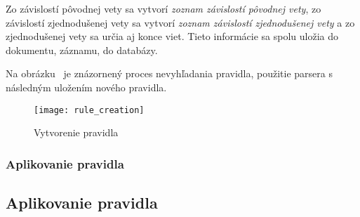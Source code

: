 Zo závislostí pôvodnej vety sa vytvorí \textit{zoznam závislostí pôvodnej vety}, zo závislostí zjednodušenej vety sa vytvorí \textit{zoznam závislostí zjednodušenej vety} a zo zjednodušenej vety sa určia aj konce viet. Tieto informácie sa spolu uložia do dokumentu, záznamu, do databázy.

Na obrázku~ je znázornený proces nevyhľadania pravidla, použitie parsera s následným uložením nového pravidla.

\begin{figure}[H]
	\begin{center}\texttt{[image: rule\_creation]}\end{center}
	\caption[Vytvorenie pravidla]{Vytvorenie pravidla}\label{fig:rule_creation}
\end{figure}

%
%
{
	\subsubsection{Aplikovanie pravidla}
}
{
	\subsection{Aplikovanie pravidla}
}